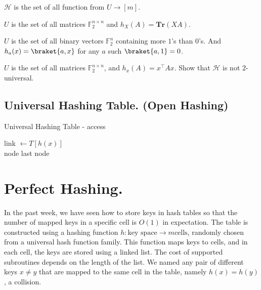 \begin{example}
  $\mathcal{H}$ is the set of all function from $U \rightarrow [m]$.
\end{example}

\newcommand*{\TR}{\mathbf{Tr}}
\begin{exercise}
  $U$ is the set of all matrices $\mathbb{F}_{2}^{n\times n}$ and $h_{X}(A) = \mathbf{Tr} \left(XA\right) $. 
\end{exercise}


\begin{exercise}
  $U$ is the set of all binary vectors $\mathbb{F}_{2}^{n}$  containing more $1$'s than $0$'s. And $h_{a}(x) = \braket{a,x}$ for any $a$ such $\braket{a,1} = 0$. 
\end{exercise}

\begin{exercise}
$U$ is the set of all matrices $\mathbb{F}_{2}^{n\times n}$, and $h_{x}(A) = x^{\top} A x$. Show that $\mathcal{H}$ is not $2$-universal.
\end{exercise}


\subsection{ Universal Hashing Table. (Open Hashing)} 

  \begin{algorithm}
    \label{alg:openhash}
  \caption{Universal Hashing Table - access}
  link $\leftarrow  T[h(x)] $  \\
   {
     {
      \Return node
    }
  }
  \Return last node
  \end{algorithm}

\section{Perfect Hashing.}
In the past week, we have seen how to store keys in hash tables so that the number of mapped keys in a specific cell is $O(1)$ in expectation. The table is constructed using a hashing function $h : \text{key space} \rightarrow m \text{cells}$, randomly chosen from a universal hash function family. This function maps keys to cells, and in each cell, the keys are stored using a linked list. The cost of supported subroutines depends on the length of the list. We named any pair of different keys $x\neq y$ that are mapped to the same cell in the table, namely $h(x) = h(y)$, a collision.

